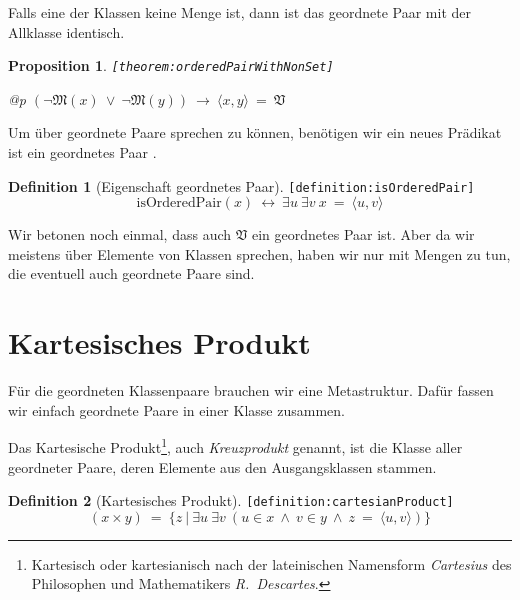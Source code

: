 \documentclass[a4paper,german,10pt,twoside]{book}
\newtheorem{prop}[thm]{Proposition}
\theoremstyle{definition}
\newtheorem{defn}{Definition}
\theoremstyle{remark}
\begin{document}
\par
Falls eine der Klassen keine Menge ist, dann ist das geordnete Paar
mit der Allklasse identisch.

\begin{prop}
\label{theorem:orderedPairWithNonSet} \hypertarget{theorem:orderedPairWithNonSet}{}
{\tt \tiny [\verb]theorem:orderedPairWithNonSet]]}
\mbox{}
\begin{longtable}{{@{\extracolsep{\fill}}p{\linewidth}}}
\centering $(\neg \mathfrak{M}(x)\ \lor\ \neg \mathfrak{M}(y))\ \rightarrow\ \langle x, y \rangle \ = \ \mathfrak{V}$
\end{longtable}

\end{prop}


\par
Um {\"u}ber geordnete Paare sprechen zu k{\"o}nnen, ben{\"o}tigen wir ein neues Pr{\"a}dikat
{\glqq ist ein geordnetes Paar \grqq}.

\begin{defn}[Eigenschaft geordnetes Paar]
\label{definition:isOrderedPair} \hypertarget{definition:isOrderedPair}{}
{\tt \tiny [\verb]definition:isOrderedPair]]}
$$\mbox{isOrderedPair}(x)\ \leftrightarrow\ \exists u\ \exists v\ x \ = \ \langle u, v \rangle$$

\end{defn}

Wir betonen noch einmal, dass auch $\mathfrak{V}$ ein geordnetes Paar ist. Aber da
wir meistens {\"u}ber Elemente von Klassen sprechen, haben wir nur mit Mengen zu tun,
die eventuell auch geordnete Paare sind.


\section{Kartesisches Produkt} \label{chapter5_section3} \hypertarget{chapter5_section3}{}
F{\"u}r die geordneten Klassenpaare brauchen wir eine Metastruktur. Daf{\"u}r fassen wir einfach geordnete
Paare in einer Klasse zusammen.

\par
Das Kartesische Produkt\footnote{Kartesisch oder kartesianisch nach der 
lateinischen Namensform \emph{Cartesius} des Philosophen und Mathematikers 
\emph{R.~Descartes}.}, auch \emph{Kreuzprodukt} genannt, ist die Klasse 
aller geordneter Paare, deren Elemente aus den Ausgangsklassen stammen.

\begin{defn}[Kartesisches Produkt]
\label{definition:cartesianProduct} \hypertarget{definition:cartesianProduct}{}
{\tt \tiny [\verb]definition:cartesianProduct]]}
$$( x \times y) \ = \ \{ z \ | \ \exists u\ \exists v\ (u \in x\ \land\ v \in y\ \land\ z \ = \ \langle u, v \rangle) \} $$
\end{defn}
\end{document}
